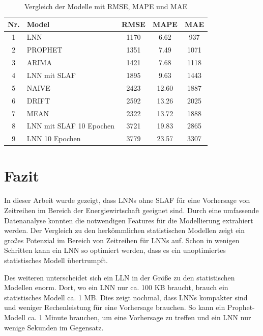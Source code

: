 \documentclass[11pt,ngerman,a4paper,]{article}
\begin{document}
\begin{table}[h!]
\centering
\begin{tabular}{|c|l|c|c|c|}
\hline
\textbf{Nr.} & \textbf{Model}              & \textbf{RMSE}    & \textbf{MAPE}    & \textbf{MAE}     \\ \hline
1            & LNN                         & 1170         & 6.62         & 937         \\ \hline
2            & PROPHET                     & 1351         & 7.49         & 1071        \\ \hline
3            & ARIMA                       & 1421         & 7.68         & 1118        \\ \hline
4            & LNN mit SLAF                & 1895         & 9.63        & 1443        \\ \hline
5            & NAIVE                       & 2423         & 12.60        & 1887        \\ \hline
6            & DRIFT                       & 2592         & 13.26        & 2025        \\ \hline
7            & MEAN                        & 2322         & 13.72        & 1888        \\ \hline
8            & LNN mit SLAF 10 Epochen     & 3721         & 19.83        & 2865        \\ \hline
9            & LNN 10 Epochen              & 3779         & 23.57        & 3307        \\ \hline
\end{tabular}
\caption{Vergleich der Modelle mit RMSE, MAPE und MAE}
\label{table:model_comparison}
\end{table}

\clearpage
\newpage

\section{Fazit}\label{fazit}

In dieser Arbeit wurde gezeigt, dass LNNs ohne SLAF für eine Vorhersage von Zeitreihen im Bereich der Energiewirtschaft geeignet sind. Durch eine umfassende Datenanalyse konnten die notwendigen Features für die Modellierung extrahiert werden. Der Vergleich zu den herkömmlichen statistischen Modellen zeigt ein großes Potenzial im Bereich von Zeitreihen für LNNs auf. Schon in wenigen Schritten kann ein LNN so optimiert werden, dass es ein unoptimiertes statistisches Modell übertrumpft.

Des weiteren unterscheidet sich ein LLN in der Größe zu den statistischen Modellen enorm. Dort, wo ein LNN nur ca. 100 KB braucht, brauch ein statistisches Modell ca. 1 MB. Dies zeigt nochmal, dass LNNs kompakter sind und weniger Rechenleistung für eine Vorhersage brauchen. So kann ein Prophet-Modell ca. 1 Minute brauchen, um eine Vorhersage zu treffen und ein LNN nur wenige Sekunden im Gegensatz.
\end{document}
